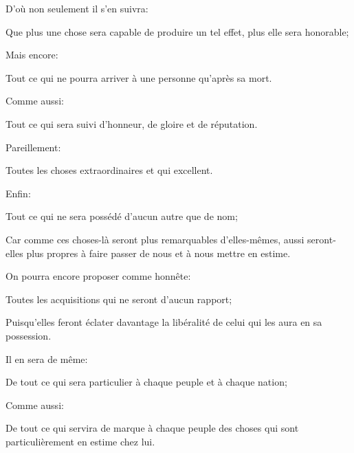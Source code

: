 D'où non seulement il s'en suivra:

\begin{lieu}
	Que plus une chose sera capable de produire un tel effet, plus elle sera honorable;
\end{lieu}

Mais encore:

\begin{lieu}
	Tout ce qui ne pourra arriver à une personne qu'après sa mort.
\end{lieu}

Comme aussi:

\begin{lieu}
	Tout ce qui sera suivi d'honneur, de gloire et de réputation.
\end{lieu}

Pareillement:

\begin{lieu}
	Toutes les choses extraordinaires et qui excellent.
\end{lieu}

Enfin:

\begin{lieu}
	Tout ce qui ne sera possédé d'aucun autre que de nom;
\end{lieu}

Car comme ces choses-là seront plus remarquables d'elles-mêmes, aussi seront-elles plus propres à faire
passer de nous et à nous mettre en estime.

\bigbreak

On pourra encore proposer comme honnête:

\begin{lieu}
	Toutes les acquisitions qui ne seront d'aucun rapport;
\end{lieu}

Puisqu'elles feront éclater davantage la libéralité de celui qui les aura en sa possession.

\bigbreak

Il en sera de même:

\begin{lieu}
	De tout ce qui sera particulier à chaque peuple et à chaque nation;
\end{lieu}

Comme aussi:

\begin{lieu}
	De tout ce qui servira de marque à chaque peuple des choses qui sont particulièrement en estime chez lui.
\end{lieu}

